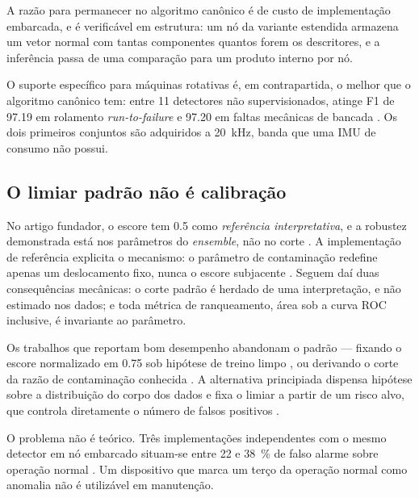 A razão para permanecer no algoritmo canônico \cite{liu2008} é de custo de implementação
embarcada, e é verificável em estrutura: um nó da variante estendida armazena um vetor
normal com tantas componentes quantos forem os descritores, e a inferência passa de uma
comparação para um produto interno por nó. 

O suporte específico para máquinas rotativas é, em contrapartida, o melhor que o algoritmo
canônico tem: entre \num{11} detectores não supervisionados, atinge F1 de \num{97,19} em
rolamento \emph{run-to-failure} e \num{97,20} em faltas mecânicas de bancada
\cite{brito2022}. Os dois primeiros conjuntos são adquiridos a \SI{20}{\kilo\hertz}, banda
que uma IMU de consumo não possui.

\subsection{O limiar padrão não é calibração}

No artigo fundador, o escore tem \num{0,5} como \emph{referência interpretativa}, e a
robustez demonstrada está nos parâmetros do \emph{ensemble}, não no corte \cite{liu2008}.
A implementação de referência explicita o mecanismo: o parâmetro de contaminação redefine
apenas um deslocamento fixo, nunca o escore subjacente \cite{scikitlearn2026}. Seguem daí
duas consequências mecânicas: o corte padrão é herdado de uma interpretação, e não estimado
nos dados; e toda métrica de ranqueamento, área sob a curva ROC inclusive, é invariante ao
parâmetro.

Os trabalhos que reportam bom desempenho abandonam o padrão --- fixando o escore
normalizado em \num{0,75} sob hipótese de treino limpo \cite{antonini2023}, ou derivando o
corte da razão de contaminação conhecida \cite{brito2022}. A alternativa principiada
dispensa hipótese sobre a distribuição do corpo dos dados e fixa o limiar a partir de um
risco alvo, que controla diretamente o número de falsos positivos \cite{siffer2017}.

O problema não é teórico. Três implementações independentes com o mesmo detector em nó
embarcado situam-se entre \num{22} e \SI{38}{\percent} de falso alarme sobre operação
normal \cite{chevtchenko2023,kolok2025}. Um dispositivo que marca um terço da operação
normal como anomalia não é utilizável em manutenção.

